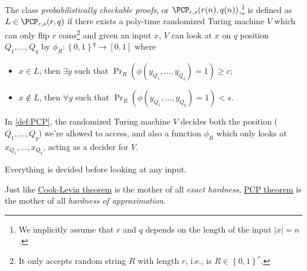 \begin{definition}[\(\PCP\)]\label{def:PCP}
	The class \emph{probabilistically checkable proofs}, or \(\PCP_{c, s}(r(n), q(n))\),\footnote{We implicitly assume that \(r\) and \(q\) depends on the length of the input \(\vert x \vert = n\).} is defined as \(L\in \PCP_{c, s}(r, q)\) if there exists a poly-time randomized Turing machine \(V\) which can only flip \(r\) coins\footnote{It only accepts random string \(R\) with length \(r\), i.e., is \(R \in \left\{ 0, 1 \right\} ^r\).} and given an input \(x\), \(V\) can look at \(x\) on \(q\) position \(Q_1, \dots  , Q_q\) by \(\phi _R\colon \left\{ 0, 1 \right\} ^q \to \left[ 0, 1 \right] \) where
	\begin{itemize}
		\item \(x\in L\), then \(\exists y\) such that \(\Pr_{R}(\phi (y_{Q_1}, \dots , y_{Q_q} ) = 1) \geq c\);
		\item \(x\notin L\), then \(\forall y\) such that \(\Pr_{R}(\phi (y_{Q_1}, \dots , y_{Q_q} ) = 1) < s\).
	\end{itemize}
\end{definition}

In \autoref{def:PCP}, the randomized Turing machine \(V\) decides both the position (\(Q_1, \dots , Q_q \)) we're allowed to access, and also a function \(\phi _R\) which only looks at \(x_{Q_1}, \dots , x_{Q_q}\), acting as a decider for \(V\).

\begin{note}
	Everything is decided before looking at any input.
\end{note}

Just like \hyperref[thm:Cook-Levin]{Cook-Levin theorem} is the mother of all \emph{exact hardness}, \hyperref[thm:PCP]{PCP theorem} is the mother of all \emph{hardness of approximation}.